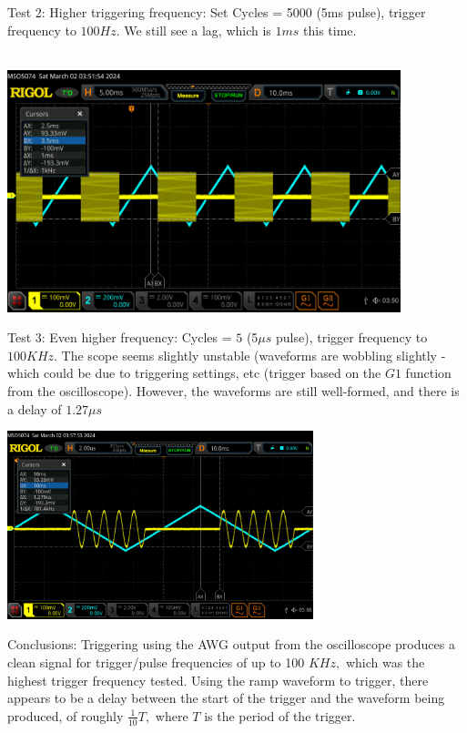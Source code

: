\documentclass{article}
\begin{document}
    Test 2: Higher triggering frequency: Set Cycles = 5000 (5ms pulse), trigger frequency to $100Hz$. We still see a lag, which is $1ms$ this time.\\\\
    \begin{mdframed}[backgroundcolor=gray!20, align = center, userdefinedwidth = 4.8in]
    \includegraphics[width = 4.5in]{img/TriggerTest2.png}
    \end{mdframed}
    Test 3: Even higher frequency: Cycles = $5$ (5$\mu s$ pulse), trigger frequency to $100KHz$. The scope seems slightly unstable (waveforms are wobbling slightly - which could be due to triggering settings, etc (trigger based on the $G1$ function from the oscilloscope). However, the waveforms are still well-formed, and there is a delay of $1.27 \mu s$
    \begin{mdframed}[backgroundcolor=gray!20, align = center, userdefinedwidth = 3.8in]
    \includegraphics[width = 3.5in]{img/TriggerTest3.png}
    \end{mdframed}
    Conclusions: Triggering using the AWG output from the oscilloscope produces a clean signal for trigger/pulse frequencies of up to 100 $KHz,$ which was the highest trigger frequency tested. Using the ramp waveform to trigger, there appears to be a delay between the start of the trigger and the waveform being produced, of roughly $\frac{1}{10}T,$ where $T$ is the period of the trigger.
\end{document}
